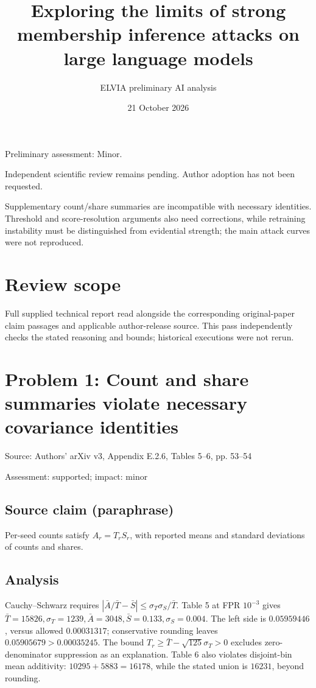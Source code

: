 \documentclass[11pt]{article}
\begin{document}
\title{Exploring the limits of strong membership inference attacks on large language models}

\author{ELVIA preliminary AI analysis}\date{21 October 2026}\maketitle

Preliminary assessment: Minor.\par

Independent scientific review remains pending. Author adoption has not been requested.

Supplementary count/share summaries are incompatible with necessary identities. Threshold and score-resolution arguments also need corrections, while retraining instability must be distinguished from evidential strength; the main attack curves were not reproduced.

\section*{Review scope}

Full supplied technical report read alongside the corresponding original-paper claim passages and applicable author-release source. This pass independently checks the stated reasoning and bounds; historical executions were not rerun.

\section*{Problem 1: Count and share summaries violate necessary covariance identities}

Source: Authors’ arXiv v3, Appendix E.2.6, Tables 5–6, pp. 53–54

Assessment: supported; impact: minor

\subsection*{Source claim (paraphrase)}

Per-seed counts satisfy \(A_r=T_rS_r\), with reported means and standard deviations of counts and shares.

\subsection*{Analysis}

Cauchy–Schwarz requires \(|\bar A/\bar T-\bar S|\le\sigma_T\sigma_S/\bar T\). Table 5 at FPR \(10^{-3}\) gives \(\bar T=15826,\sigma_T=1239,\bar A=3048,\bar S=0.133,\sigma_S=0.004\). The left side is \(0.05959446\), versus allowed \(0.00031317\); conservative rounding leaves \(0.05905679>0.00035245\). The bound \(T_r\ge\bar T-\sqrt{125}\sigma_T>0\) excludes zero-denominator suppression as an explanation. Table 6 also violates disjoint-bin mean additivity: \(10295+5883=16178\), while the stated union is \(16231\), beyond rounding.
\end{document}
